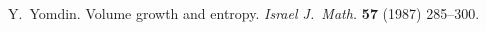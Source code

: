\documentclass{amsart}
\theoremstyle{definition}
\theoremstyle{remark}
\numberwithin{equation}{section}
\begin{document}
\begin{thebibliography}{xxxx}
Y.\ Yomdin. Volume growth and entropy. 
{\it Israel J.\ Math.}  {\bf 57} (1987) 285--300.


%
%
%

%
%
%
%

\end{thebibliography}
\end{document}
